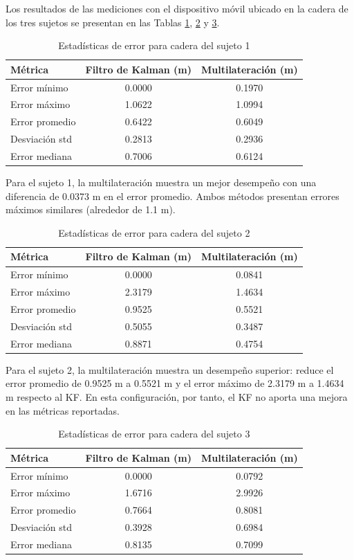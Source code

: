 Los resultados de las mediciones con el dispositivo móvil ubicado en la cadera de los tres sujetos se presentan en las Tablas \ref{tab:estadisticas_cadera_s1}, \ref{tab:estadisticas_cadera_s2} y \ref{tab:estadisticas_cadera_s3}.
%
\begin{table}[t]
\centering
\caption{Estadísticas de error para cadera del sujeto 1}
\label{tab:estadisticas_cadera_s1}
\begin{tabular}{lcc}
\hline
\rowcolor{headerblue}
\textbf{Métrica} & \textbf{Filtro de Kalman (m)} & \textbf{Multilateración (m)} \\
\hline
Error mínimo & 0.0000 & 0.1970 \\
Error máximo & 1.0622 & 1.0994 \\
Error promedio & 0.6422 & 0.6049 \\
Desviación std & 0.2813 & 0.2936 \\
Error mediana & 0.7006 & 0.6124 \\
\hline
\end{tabular}
\end{table}
%
Para el sujeto 1, la multilateración muestra un mejor desempeño con una diferencia de 0.0373 m en el error promedio. Ambos métodos presentan errores máximos similares (alrededor de 1.1 m). 
%
\begin{table}[t]
\centering
\caption{Estadísticas de error para cadera del sujeto 2}
\label{tab:estadisticas_cadera_s2}
\begin{tabular}{lcc}
\hline
\rowcolor{headerblue}
\textbf{Métrica} & \textbf{Filtro de Kalman (m)} & \textbf{Multilateración (m)} \\
\hline
Error mínimo & 0.0000 & 0.0841 \\
Error máximo & 2.3179 & 1.4634 \\
Error promedio & 0.9525 & 0.5521 \\
Desviación std & 0.5055 & 0.3487 \\
Error mediana & 0.8871 & 0.4754 \\
\hline
\end{tabular}
\end{table}
%
Para el sujeto 2, la multilateración muestra un desempeño superior: reduce el error promedio de 0.9525 m a 0.5521 m y el error máximo de 2.3179 m a 1.4634 m respecto al KF. En esta configuración, por tanto, el KF no aporta una mejora en las métricas reportadas.
%
\begin{table}[t]
\centering
\caption{Estadísticas de error para cadera del sujeto 3}
\label{tab:estadisticas_cadera_s3}
\begin{tabular}{lcc}
\hline
\rowcolor{headerblue}
\textbf{Métrica} & \textbf{Filtro de Kalman (m)} & \textbf{Multilateración (m)} \\
\hline
Error mínimo & 0.0000 & 0.0792 \\
Error máximo & 1.6716 & 2.9926 \\
Error promedio & 0.7664 & 0.8081 \\
Desviación std & 0.3928 & 0.6984 \\
Error mediana & 0.8135 & 0.7099 \\
\hline
\end{tabular}
\end{table}
